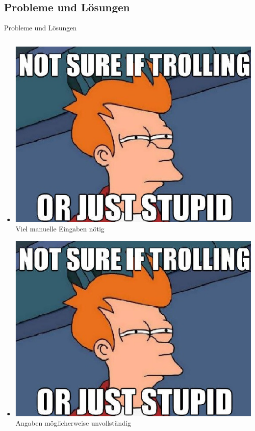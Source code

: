 \documentclass{beamer} %
\begin{document}
	\subsection{Probleme und Lösungen}
	\begin{frame}{Probleme und Lösungen}
		\begin{columns}[c]
			\begin{column}{0.5\textwidth}
				\begin{itemize}
					\item \includegraphics[height=\baselineskip]{uebung10_Soloninov_Dorkenwald} Viel manuelle Eingaben nötig
					\item \includegraphics[height=\baselineskip]{uebung10_Soloninov_Dorkenwald} Angaben möglicherweise unvollständig

\end{itemize}
\end{column}
\end{columns}
\end{frame}
\end{document}
